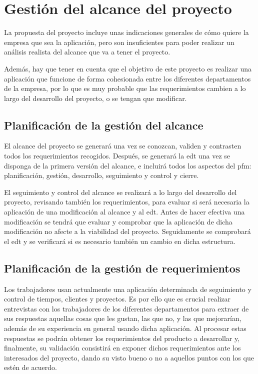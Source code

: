\section{Gestión del alcance del proyecto}
La propuesta del proyecto incluye unas indicaciones generales de cómo quiere
la empresa que sea la aplicación, pero son insuficientes para poder realizar
un análisis realista del alcance que va a tener el proyecto.

Además, hay que tener en cuenta que el objetivo de este proyecto es realizar
una aplicación que funcione de forma cohesionada entre los diferentes
departamentos de la empresa, por lo que es muy probable que las
requerimientos cambien a lo largo del desarrollo del proyecto, o se tengan
que modificar.

\subsection{Planificación de la gestión del alcance}
El alcance del proyecto se generará una vez se conozcan, validen y contrasten
todos los requerimientos recogidos. Después, se generará la \gls{edt} una vez
se disponga de la primera versión del alcance, e incluirá todos los aspectos
del \gls{pfm}: planificación, gestión, desarrollo, seguimiento y control y
cierre.

El seguimiento y control del alcance se realizará a lo largo del desarrollo
del proyecto, revisando también los requerimientos, para evaluar si será
necesaria la aplicación de una modificación al alcance y al \gls{edt}. Antes de
hacer efectiva una modificación se tendrá que evaluar y comprobar que la
aplicación de dicha modificación no afecte a la viabilidad del proyecto.
Seguidamente se comprobará el \gls{edt} y se verificará si es necesario también
un cambio en dicha estructura.

\subsection{Planificación de la gestión de requerimientos}
\label{subsec:pgr}
Los trabajadores usan actualmente una aplicación determinada de seguimiento y
control de tiempos, clientes y proyectos. Es por ello que es crucial realizar
entrevistas con los trabajadores de los diferentes departamentos para extraer
de sus respuestas aquellas cosas que les gustan, las que no, y las que
mejorarían, además de su experiencia en general usando dicha aplicación. Al
procesar estas respuestas se podrán obtener los requerimientos del producto
a desarrollar y, finalmente, su validación consistirá en exponer dichos
requerimientos ante los interesados del proyecto, dando su visto bueno o no
a aquellos puntos con los que estén de acuerdo.

